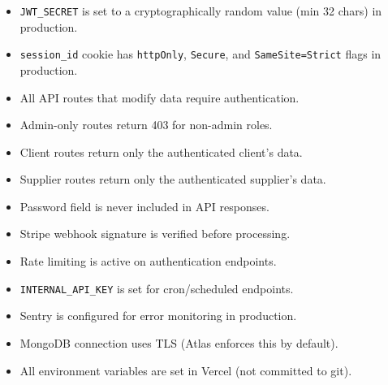 \documentclass[12pt,onecolumn]{IEEEtran}
\begin{document}
\begin{tcolorbox}[criticalbox,title={Pre-Release Security Checklist}]
\begin{itemize}[leftmargin=1.5em]
  \item[$\square$] \texttt{JWT\_SECRET} is set to a cryptographically random value (min 32 chars) in production.
  \item[$\square$] \texttt{session\_id} cookie has \texttt{httpOnly}, \texttt{Secure}, and \texttt{SameSite=Strict} flags in production.
  \item[$\square$] All API routes that modify data require authentication.
  \item[$\square$] Admin-only routes return 403 for non-admin roles.
  \item[$\square$] Client routes return only the authenticated client's data.
  \item[$\square$] Supplier routes return only the authenticated supplier's data.
  \item[$\square$] Password field is never included in API responses.
  \item[$\square$] Stripe webhook signature is verified before processing.
  \item[$\square$] Rate limiting is active on authentication endpoints.
  \item[$\square$] \texttt{INTERNAL\_API\_KEY} is set for cron/scheduled endpoints.
  \item[$\square$] Sentry is configured for error monitoring in production.
  \item[$\square$] MongoDB connection uses TLS (Atlas enforces this by default).
  \item[$\square$] All environment variables are set in Vercel (not committed to git).
\end{itemize}
\end{tcolorbox}
\end{document}
